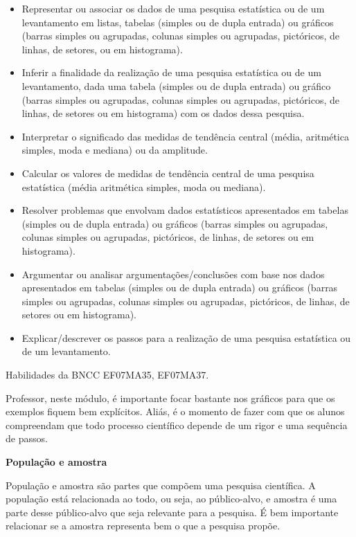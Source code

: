 \begin{itemize}
\item
  Representar ou associar os dados de uma pesquisa estatística ou de um
  levantamento em listas, tabelas (simples ou de dupla entrada) ou
  gráficos (barras simples ou agrupadas, colunas simples ou agrupadas,
  pictóricos, de linhas, de setores, ou em histograma).
\item
  Inferir a finalidade da realização de uma pesquisa estatística ou de
  um levantamento, dada uma tabela (simples ou de dupla entrada) ou
  gráfico (barras simples ou agrupadas, colunas simples ou agrupadas,
  pictóricos, de linhas, de setores ou em histograma) com os dados dessa
  pesquisa.~
\item
  Interpretar o significado das medidas de tendência central (média,
  aritmética simples, moda e mediana) ou da amplitude.
\item
  Calcular os valores de medidas de tendência central de uma pesquisa
  estatística (média aritmética simples, moda ou mediana).
\item
  Resolver problemas que envolvam dados estatísticos apresentados em
  tabelas (simples ou de dupla entrada) ou gráficos (barras simples ou
  agrupadas, colunas simples ou agrupadas, pictóricos, de linhas, de
  setores ou em histograma).
\item
  Argumentar ou analisar argumentações/conclusões com base nos dados
  apresentados em tabelas (simples ou de dupla entrada) ou gráficos
  (barras simples ou agrupadas, colunas simples ou agrupadas,
  pictóricos, de linhas, de setores ou em histograma).
\item
  Explicar/descrever os passos para a realização de uma pesquisa
  estatística ou de um levantamento.
\end{itemize}

Habilidades da BNCC EF07MA35, EF07MA37.

Professor, neste módulo, é importante focar bastante nos gráficos para
que os exemplos fiquem bem explícitos. Aliás, é o momento de fazer com
que os alunos compreendam que todo processo científico depende de um
rigor e uma sequência de passos.

\textbf{População e amostra}

População e amostra são partes que compõem uma pesquisa científica. A
população está relacionada ao todo, ou seja, ao público-alvo, e amostra
é uma parte desse público-alvo que seja relevante para a pesquisa. É bem
importante relacionar se a amostra representa bem o que a pesquisa
propõe.

